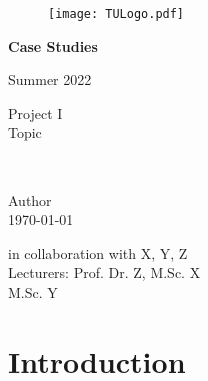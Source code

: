 \documentclass[12pt,a4paper]{article}
\numberwithin{equation}{section}
\begin{document}
\begin{titlepage}
\begin{figure}[!htp]
     \hspace*{-1.1cm}
 \begin{minipage}[r][0.22\paperwidth][l]{0.2\paperwidth}
\texttt{[image: TULogo.pdf]}    %
\end{minipage} \hspace{21cm}
   \end{figure}


\thispagestyle{empty}
  \sffamily

\begin{center}
   \begin{Huge}
   \textbf{Case Studies} \\
   \end{Huge}
   \begin{large}
  Summer 2022\\
\end{large}

   \vspace{3cm}

\begin{large}
Project I\\
Topic
\end{large}\\
\color{black}
  \vspace{1cm}
\begin{large}
 Author\\
 \today                    
 \end{large}

   \vspace{3cm}
\begin{large}
   in collaboration with X, Y, Z\\
	\vspace{1,5cm}
   Lecturers: Prof. Dr. Z, M.Sc. X\\
	M.Sc. Y 
\end{large}

  \end{center}
 \end{titlepage}

\newpage

\tableofcontents
\thispagestyle{empty}

\newpage
\setcounter{page}{1}
\section{Introduction}
\renewcommand{\baselinestretch}{1.5}\normalsize 
\end{document}
